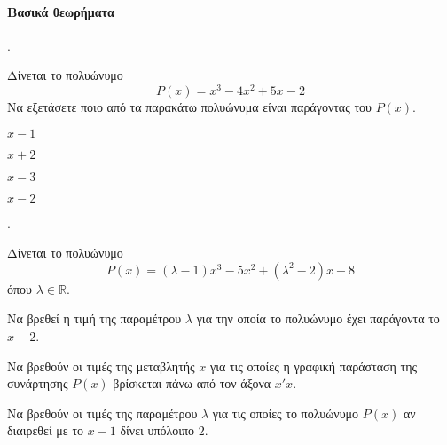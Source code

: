 \documentclass[11pt,a4paper,twocolumn]{article}
\newcounter{askhsh}
\newcommand{\askhsh}{\large\theaskhsh.\ \addtocounter{askhsh}{1}}
\begin{document}
\paragraph{Βασικά θεωρήματα}
\askhsh Δίνεται το πολυώνυμο
\[ P(x)=x^3-4x^2+5x-2 \]
Να εξετάσετε ποιο από τα παρακάτω πολυώνυμα είναι παράγοντας του $P(x)$.
\begin{multicols}{4}
\begin{alist}
\item $x-1$
\item $x+2$
\item $x-3$
\item $x-2$
\end{alist}
\end{multicols}
\askhsh Δίνεται το πολυώνυμο \[ P(x)=(\lambda-1)x^3-5x^2+(\lambda^2-2)x+8 \] όπου $ \lambda\in\mathbb{R} $.
\begin{alist}
\item Να βρεθεί η τιμή της παραμέτρου $ \lambda $ για την οποία το πολυώνυμο έχει παράγοντα το $ x-2 $.
\item Να βρεθούν οι τιμές της μεταβλητής $ x $ για τις οποίες η γραφική παράσταση της συνάρτησης $ P(x) $ βρίσκεται πάνω από τον άξονα $ x'x $.
\item Να βρεθούν οι τιμές της παραμέτρου $ \lambda $ για τις οποίες το πολυώνυμο $ P(x) $ αν διαιρεθεί με το $ x-1 $ δίνει υπόλοιπο $ 2 $.
\end{alist}
\end{document}
